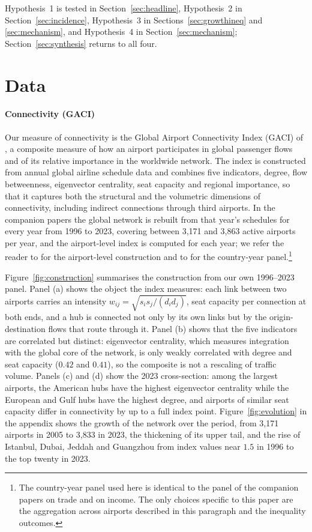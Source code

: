 Hypothesis~1 is tested in Section~\ref{sec:headline}, Hypothesis~2 in Section~\ref{sec:incidence}, Hypothesis~3 in Sections~\ref{sec:growthineq} and \ref{sec:mechanism}, and Hypothesis~4 in Section~\ref{sec:mechanism}; Section~\ref{sec:synthesis} returns to all four.

\section{Data}
\label{sec:data}
\paragraph{Connectivity (GACI)}
Our measure of connectivity is the Global Airport Connectivity Index (GACI) of \citet{Cheung_2020}, a composite measure of how an airport participates in global passenger flows and of its relative importance in the worldwide network. The index is constructed from annual global airline schedule data and combines five indicators, degree, flow betweenness, eigenvector centrality, seat capacity and regional importance, so that it captures both the structural and the volumetric dimensions of connectivity, including indirect connections through third airports. In the companion papers the global network is rebuilt from that year's schedules for every year from 1996 to 2023, covering between 3{,}171 and 3{,}863 active airports per year, and the airport-level index is computed for each year; we refer the reader to \citet{Cheung_2020} for the airport-level construction and to \citet{Yue_2026} for the country-year panel.\footnote{The country-year panel used here is identical to the panel of the companion papers on trade and on income. The only choices specific to this paper are the aggregation across airports described in this paragraph and the inequality outcomes.}

Figure~\ref{fig:construction} summarises the construction from our own 1996--2023 panel. Panel (a) shows the object the index measures: each link between two airports carries an intensity $w_{ij}=\sqrt{s_i s_j/(d_i d_j)}$, seat capacity per connection at both ends, and a hub is connected not only by its own links but by the origin-destination flows that route through it. Panel (b) shows that the five indicators are correlated but distinct: eigenvector centrality, which measures integration with the global core of the network, is only weakly correlated with degree and seat capacity ($0.42$ and $0.41$), so the composite is not a rescaling of traffic volume. Panels (c) and (d) show the 2023 cross-section: among the largest airports, the American hubs have the highest eigenvector centrality while the European and Gulf hubs have the highest degree, and airports of similar seat capacity differ in connectivity by up to a full index point. Figure~\ref{fig:evolution} in the appendix shows the growth of the network over the period, from 3{,}171 airports in 2005 to 3{,}833 in 2023, the thickening of its upper tail, and the rise of Istanbul, Dubai, Jeddah and Guangzhou from index values near $1.5$ in 1996 to the top twenty in 2023.

